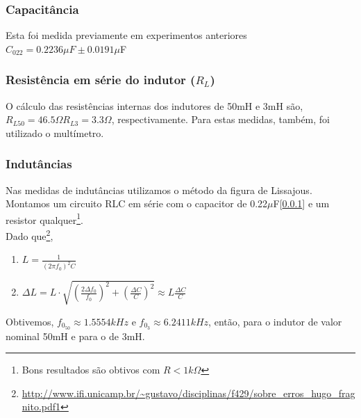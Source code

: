 \documentclass[12pt,letterpaper]{article}
\begin{document}
\subsubsection{Capacitância} \label{itm:ccap} Esta foi medida previamente em experimentos anteriores $C_{022} = 0.2236\mu F \pm 0.0191\mu$F
\subsubsection{Resistência em série do indutor ($R_L$)} \label{itm:rindutor}  O cálculo das resistências internas dos indutores de 50mH e 3mH são, $R_{L50} = 46.5\Omega R_{L3} = 3.3\Omega$, respectivamente. Para estas medidas, também, foi utilizado o multímetro.
\subsubsection{Indutâncias} \label{itm:iindutor} Nas medidas de indutâncias utilizamos o método da figura de Lissajous. Montamos um circuito RLC em série com o capacitor de 0.22$\mu$F[\ref{itm:ccap}] e um resistor qualquer\footnote{Bons resultados são obtivos com $R < 1k\Omega$}.\\
Dado que\footnote{\url{http://www.ifi.unicamp.br/~gustavo/disciplinas/f429/sobre_erros_hugo_fragnito.pdf1}},
\begin{enumerate}[I]
\item $L = \frac{1}{(2\pi f_0)^2 C}$ 
\item $\Delta{L} = L \cdot \sqrt{(\frac{2\Delta f_0}{f_0})^2 + (\frac{\Delta C}{C})^2} \approx L \frac{\Delta C}{C}$
\end{enumerate}
Obtivemos, $f_{0_{50}} \approx 1.5554kHz$ e $f_{0_3} \approx 6.2411kHz$, então,  para o indutor de valor nominal 50mH e  para o de 3mH.
\end{document}
